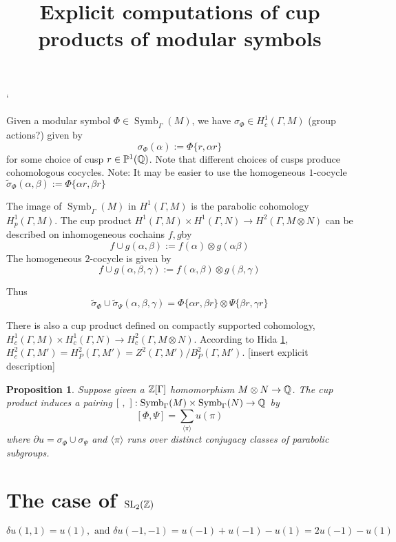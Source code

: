`\documentclass[12pt]{article}
\newtheorem{prop}[thm]{Proposition}
\theoremstyle{definition}
\def\Z{{\Bbb Z}}
\def\Q{{\Bbb Q}}
\def\P{\mathbb{P}}
\def\SL{\operatorname{SL}}
\def\Symb{\operatorname{Symb}}
\def\P{\mathbb{P}}
\begin{document}
\title{Explicit computations of cup products of modular symbols}
\maketitle

Given a modular symbol $\Phi\in\Symb_\Gamma(M)$, we have $\sigma_\Phi \in H^1_c(\Gamma,M)$ (group actions?) given by
$$\sigma_\Phi(\alpha) :=\Phi\{r,\alpha r\}$$
for some choice of cusp $r\in \P^1(\Q)$. Note that different choices of cusps produce cohomologous cocycles.
Note: It may be easier to use the homogeneous $1$-cocycle $\widetilde{\sigma}_{\Phi}(\alpha,\beta):=\Phi\{\alpha r,\beta r\}$

The image of $\Symb_\Gamma(M)$ in $H^1(\Gamma,M)$ is the parabolic cohomology $H^1_p(\Gamma,M)$. The cup product  $H^1(\Gamma,M)\times H^1(\Gamma,N)\rightarrow H^2(\Gamma,M\otimes N)$ can be described on inhomogeneous cochains $f,g$by
$$ f\cup g (\alpha,\beta):=f(\alpha)\otimes g(\alpha\beta)$$
The homogeneous $2$-cocycle is given by
$$ f\cup g (\alpha,\beta,\gamma):=f(\alpha,\beta) \otimes g(\beta,\gamma)$$

Thus
$$\widetilde{\sigma}_\Phi \cup \widetilde{\sigma}_\Psi(\alpha,\beta,\gamma)= \Phi\{\alpha r,\beta r\}\otimes\Psi\{\beta r,\gamma r\}$$

There is also a cup product defined on compactly supported cohomology, $H^1_c(\Gamma,M)\times H^1_c(\Gamma,N)\rightarrow H^2_c(\Gamma,M\otimes N)$. According to Hida \ref{}, $H^2_c(\Gamma, M')=H^2_P(\Gamma,M')=Z^2(\Gamma,M')/B_P^2(\Gamma,M')$. [insert explicit description]

\begin{prop}
Suppose given a $\Z[\Gamma]$ homomorphism $M\otimes N\rightarrow \Q$. The cup product induces a pairing $[~,~] : \Symb_\Gamma(M)\times \Symb_\Gamma(N) \rightarrow \Q$ by
$$[\Phi,\Psi]=\sum_{\langle \pi\rangle } u(\pi)$$
where $\partial u= \sigma_\Phi \cup \sigma_\Psi$ and $\langle \pi\rangle $ runs over distinct conjugacy classes of parabolic subgroups.
\end{prop}

\section{The case of $\SL_2(\Z)$}
\begin{equation*}
	\delta u(1,1)=u(1), \text{ and } \delta u(-1,-1) =u(-1)+u(-1)-u(1)=2u(-1)-u(1)
\end{equation*}
\end{document}
